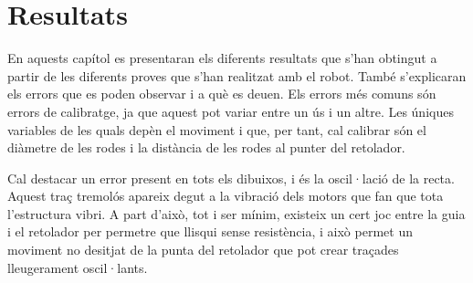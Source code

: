 \setlength\topmargin{8mm}
\onehalfspacing
\chapter{Resultats} %

\label{Chapter6} %


En aquests capítol es presentaran els diferents resultats que s'han obtingut a partir de les diferents proves que s'han realitzat amb el robot. També s'explicaran els errors que es poden observar i a què es deuen. Els errors més comuns són errors de calibratge, ja que aquest pot variar entre un ús i un altre. Les úniques variables de les quals depèn el moviment i que, per tant, cal calibrar són el diàmetre de les rodes i la distància de les rodes al punter del retolador. 

Cal destacar un error present en tots els dibuixos, i és la oscil·lació de la recta. Aquest traç tremolós apareix degut a la vibració dels motors que fan que tota l'estructura vibri. A part d'això, tot i ser mínim, existeix un cert joc entre la guia i el retolador per permetre que llisqui sense resistència, i això permet un moviment no desitjat de la punta del retolador que pot crear traçades lleugerament oscil·lants.


